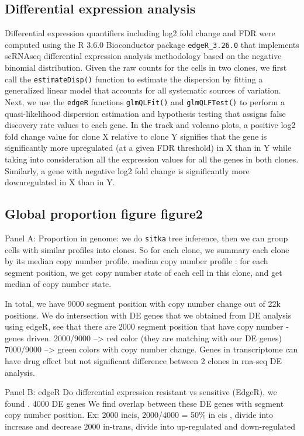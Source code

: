 \subsection{Differential expression analysis}
Differential expression quantifiers including log2 fold change and FDR  were computed using the R 3.6.0 Bioconductor package \texttt{edgeR\_3.26.0} that implements scRNAseq differential expression analysis methodology based on the negative binomial distribution. Given the raw counts for the cells in two clones, we first call the \texttt{estimateDisp()} function to estimate the dispersion by fitting a generalized linear model that accounts for all systematic sources of variation. Next, we use the \texttt{edgeR} functions \texttt{glmQLFit()} and \texttt{glmQLFTest()} to perform a quasi-likelihood dispersion estimation and hypothesis testing that assigns false discovery rate values to each gene. In the track and volcano plots, a positive log2 fold change value for clone X relative to clone Y signifies that the gene is significantly more upregulated (at a given FDR threshold) in X than in Y while taking into consideration all the expression values for all the genes in both clones. Similarly, a gene with negative log2 fold change is significantly more downregulated in X than in Y.

\subsection{Global proportion figure figure2}

Panel A: 
Proportion in genome: we do \texttt{sitka} tree inference, then we can group cells with similar profiles into clones. So for each clone, we summary each clone by its median copy number profile. 
median copy number profile : for each segment position, we get copy number state of each cell in this clone, and get median of copy number state. 

In total, we have 9000 segment position with copy number change out of 22k positions. 
We do intersection with DE genes that we obtained from DE analysis using edgeR, see that there are 2000 segment position that have copy number -genes driven. 
2000/9000 --> red color (they are matching with our DE genes)
7000/9000 --> green colors with copy number change. Genes in transcriptome can have drug effect but not significant difference between 2 clones in rna-seq DE analysis. 


Panel B: edgeR
Do differential expression resistant vs sensitive (EdgeR), 
we found . 4000 DE genes
We find overlap between these DE genes with segment copy number position. 
Ex: 2000 incis, 2000/4000 = 50\% in cis , divide into increase and decrease
2000 in-trans, divide into up-regulated and down-regulated 

